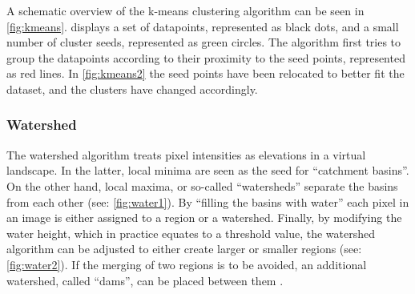 \noindent
A schematic overview of the k-means clustering algorithm can be seen in \cref{fig:kmeans}.
 displays a set of datapoints, represented as black dots, and a small number of
cluster seeds, represented as green circles.
The algorithm first tries to group the datapoints according to their proximity to the seed points, represented as red lines.
In \cref{fig:kmeans2} the seed points have been relocated to better fit the dataset, and the clusters have changed accordingly.


\subsubsection{Watershed}
The watershed algorithm treats pixel intensities as elevations in a virtual landscape.
In the latter, local minima are seen as the seed for ``catchment basins''.
On the other hand, local maxima, or so-called ``watersheds'' separate the basins from each other (see: \cref{fig:water1}).
By ``filling the basins with water'' each pixel in an image is either assigned to a region or a watershed.
Finally, by modifying the water height, which in practice equates to a threshold value,
the watershed algorithm can be adjusted to either create larger or smaller regions (see: \cref{fig:water2}).
If the merging of two regions is to be avoided, an additional watershed, called ``dams'',
can be placed between them \cite{preimImageAnalysisMedical2014,hahnIWTinteractiveWatershedTransform2003}.

